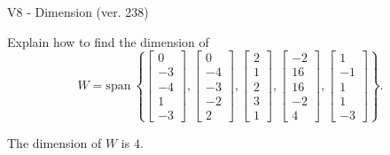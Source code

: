 \begin{exercise}
  \begin{exerciseTitle}V8 - Dimension (ver. 238)\end{exerciseTitle}
  \begin{exerciseStatement}
    Explain how to find the dimension of 
\[W=\mathrm{span}\ \left\{\left[\begin{array}{r}
0 \\
-3 \\
-4 \\
1 \\
-3
\end{array}\right] , \left[\begin{array}{r}
0 \\
-4 \\
-3 \\
-2 \\
2
\end{array}\right] , \left[\begin{array}{r}
2 \\
1 \\
2 \\
3 \\
1
\end{array}\right] , \left[\begin{array}{r}
-2 \\
16 \\
16 \\
-2 \\
4
\end{array}\right] , \left[\begin{array}{r}
1 \\
-1 \\
1 \\
1 \\
-3
\end{array}\right]\right\}.\]



  \end{exerciseStatement}
  \begin{exerciseAnswer}
   The dimension of \(W\) is  \(4\).
  


  \end{exerciseAnswer}
\end{exercise}